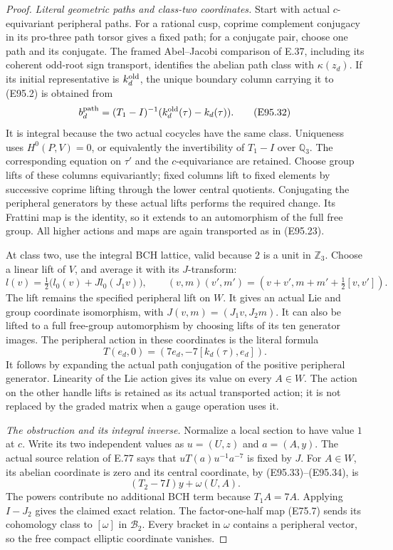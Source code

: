 \begin{proof}
\emph{Literal geometric paths and class-two coordinates.}
Start with actual $c$-equivariant peripheral paths.
For a rational cusp, coprime complement conjugacy in
its pro-three path torsor gives a fixed path; for a
conjugate pair, choose one path and its conjugate.
The framed Abel--Jacobi comparison of E.37, including
its coherent odd-root sign transport, identifies the
abelian path class with $\kappa(z_d)$. If its initial
representative is $k_d^{\rm old}$, the unique boundary
column carrying it to (E95.2) is obtained from
\[
 b_d^{\rm path}=(T_1-I)^{-1}
                 (k_d^{\rm old}(\tau)-k_d(\tau)).
 \tag{E95.32}
\]
It is integral because the two actual cocycles have
the same class. Uniqueness uses $H^0(P,V)=0$, or
equivalently the invertibility of $T_1-I$ over
$\mathbb Q_3$. The corresponding equation on $\tau'$
and the $c$-equivariance are retained. Choose group
lifts of these columns equivariantly; fixed columns
lift to fixed elements by successive coprime lifting
through the lower central quotients. Conjugating the
peripheral generators by these actual lifts performs
the required change. Its Frattini map is the identity,
so it extends to an automorphism of the full free group.
All higher actions and maps are again transported as
in (E95.23).

At class two, use the integral BCH lattice, valid
because $2$ is a unit in $\mathbb Z_3$. Choose a
linear lift of $V$, and average it with its $J$-transform:
\[
 l(v)=\tfrac12\bigl(l_0(v)+J l_0(J_1v)\bigr),
 \qquad
 (v,m)(v',m')=(v+v',m+m'+\tfrac12[v,v']).
 \tag{E95.33}
\]
The lift remains the specified peripheral lift on $W$.
It gives an actual Lie and group coordinate isomorphism,
with $J(v,m)=(J_1v,J_2m)$. It can also be lifted to a
full free-group automorphism by choosing lifts of its
ten generator images. The peripheral action in these
coordinates is the literal formula
\[
 T(e_d,0)=(7e_d,-7[k_d(\tau),e_d]).
 \tag{E95.34}
\]
It follows by expanding the actual path conjugation
of the positive peripheral generator. Linearity of
the Lie action gives its value on every $A\in W$.
The action on the other handle lifts is retained as
its actual transported action; it is not replaced by
the graded matrix when a gauge operation uses it.

\emph{The obstruction and its integral inverse.}
Normalize a local section to have value $1$ at $c$.
Write its two independent values as $u=(U,z)$ and
$a=(A,y)$. The actual source relation of E.77 says
that $uT(a)u^{-1}a^{-7}$ is fixed by $J$.
For $A\in W$, its abelian coordinate is zero and
its central coordinate, by (E95.33)--(E95.34), is
\[
                 (T_2-7I)y+\omega(U,A).
 \tag{E95.35}
\]
The powers contribute no additional BCH term because
$T_1A=7A$. Applying $I-J_2$ gives the claimed exact
relation. The factor-one-half map (E75.7) sends its
cohomology class to $[\omega]$ in $\mathcal B_2$.
Every bracket in $\omega$ contains a peripheral
vector, so the free compact elliptic coordinate
vanishes.


\end{proof}
